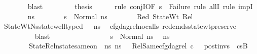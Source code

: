\begin{isabellebody}
\ \ \ \ \ \ \isamarkupfalse%
\ blast\isanewline
\ \ \isanewline
\ \ \ \ \isamarkupfalse%
\ {\isacharquery}{\kern0pt}thesis\isanewline
\ \ \ \ \isamarkupfalse%
\ {\isacharparenleft}{\kern0pt}rule\ conjI{\isacharbrackleft}{\kern0pt}OF\ {\isacartoucheopen}s{\isacharprime}{\kern0pt}\ {\isasymnoteq}\ Failure{\isacartoucheclose}{\isacharbrackright}{\kern0pt}{\isacharcomma}{\kern0pt}\ rule\ allI{\isacharcomma}{\kern0pt}\ rule\ impI{\isacharparenright}{\kern0pt}\isanewline
\ \ \ \ \ \ \isamarkupfalse%
\ ns{\isacharprime}{\kern0pt}\isanewline
\ \ \ \ \ \ \isamarkupfalse%
\ {\isachardoublequoteopen}s{\isacharprime}{\kern0pt}\ {\isacharequal}{\kern0pt}\ Normal\ ns{\isacharprime}{\kern0pt}{\isachardoublequoteclose}\isanewline
\ \ \ \ \ \ \isamarkupfalse%
\ Red\ StateWt\ Rel\ \isamarkupfalse%
\ StateWtNs{\isacharprime}{\kern0pt}{\isacharcolon}{\kern0pt}{\isachardoublequoteopen}state{\isacharunderscore}{\kern0pt}well{\isacharunderscore}{\kern0pt}typed\ {\isasymLambda}\ {\isasymOmega}\ ns{\isacharprime}{\kern0pt}{\isachardoublequoteclose}\ \isamarkupfalse%
\ cfg{\isacharunderscore}{\kern0pt}dag{\isacharunderscore}{\kern0pt}rel{\isacharunderscore}{\kern0pt}no{\isacharunderscore}{\kern0pt}calls{\isacharunderscore}{\kern0pt}{}\ red{\isacharunderscore}{\kern0pt}cmds{\isacharunderscore}{\kern0pt}state{\isacharunderscore}{\kern0pt}wt{\isacharunderscore}{\kern0pt}preserve\isanewline
\ \ \ \ \ \ \ \ \isamarkupfalse%
\ blast\isanewline
\ \ \ \ \ \ \ \ \isanewline
\ \ \ \ \ \ \isamarkupfalse%
\ {\isacartoucheopen}s{\isacharprime}{\kern0pt}\ {\isacharequal}{\kern0pt}\ Normal\ ns{\isacharprime}{\kern0pt}{\isacartoucheclose}\ \isamarkupfalse%
\ ns{}{\isacharprime}{\kern0pt}{\isacharprime}{\kern0pt}\ \ \isanewline
\ \ \ \ \ \ \ \ StateRel{}{\isacharcolon}{\kern0pt}{\isachardoublequoteopen}nstate{\isacharunderscore}{\kern0pt}same{\isacharunderscore}{\kern0pt}on\ {\isasymLambda}\ ns{\isacharprime}{\kern0pt}\ ns{}{\isacharprime}{\kern0pt}{\isacharprime}{\kern0pt}\ {\isacharbraceleft}{\kern0pt}{\isacharbraceright}{\kern0pt}{\isachardoublequoteclose}\ \ RelSame{\isacharcolon}{\kern0pt}{\isachardoublequoteopen}cfg{\isacharunderscore}{\kern0pt}dag{\isacharunderscore}{\kern0pt}rel\ c\ {\isacharbrackleft}{\kern0pt}{\isacharbrackright}{\kern0pt}\ {\isacharbrackleft}{\kern0pt}{\isacharbrackright}{\kern0pt}\ post{\isacharunderscore}{\kern0pt}invs\ {\isacharbrackleft}{\kern0pt}{\isacharbrackright}{\kern0pt}\ cs{}B{\isacharprime}{\kern0pt}{\isacharprime}{\kern0pt}{\isachardoublequoteclose}\ \ \isanewline

\end{isabellebody}
